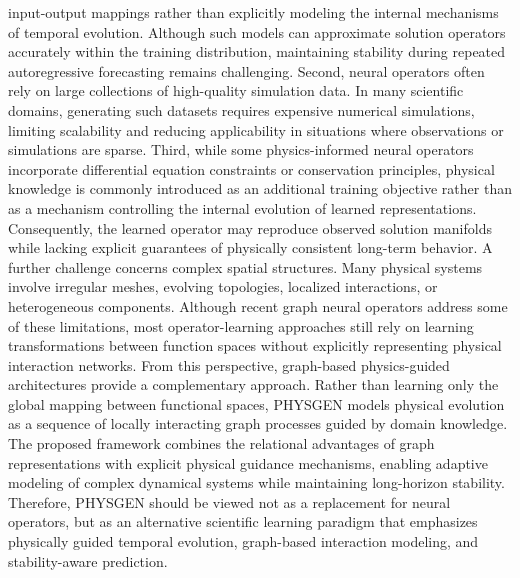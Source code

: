 input-output mappings rather than explicitly modeling the internal mechanisms of temporal evolution. Although such models can approximate solution operators accurately within the training distribution, maintaining stability during repeated autoregressive forecasting remains challenging. Second, neural operators often rely on large collections of high-quality simulation data. In many scientific domains, generating such datasets requires expensive numerical simulations, limiting scalability and reducing applicability in situations where observations or simulations are sparse. Third, while some physics-informed neural operators incorporate differential equation constraints or conservation principles, physical knowledge is commonly introduced as an additional training objective rather than as a mechanism controlling the internal evolution of learned representations. Consequently, the learned operator may reproduce observed solution manifolds while lacking explicit guarantees of physically consistent long-term behavior. A further challenge concerns complex spatial structures. Many physical systems involve irregular meshes, evolving topologies, localized interactions, or heterogeneous components. Although recent graph neural operators address some of these limitations, most operator-learning approaches still rely on learning transformations between function spaces without explicitly representing physical interaction networks. From this perspective, graph-based physics-guided architectures provide a complementary approach. Rather than learning only the global mapping between functional spaces, PHYSGEN models physical evolution as a sequence of locally interacting graph processes guided by domain knowledge. The proposed framework combines the relational advantages of graph representations with explicit physical guidance mechanisms, enabling adaptive modeling of complex dynamical systems while maintaining long-horizon stability. Therefore, PHYSGEN should be viewed not as a replacement for neural operators, but as an alternative scientific learning paradigm that emphasizes physically guided temporal evolution, graph-based interaction modeling, and stability-aware prediction. \] 

